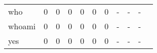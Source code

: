 \begin{longtable}{lp{1.2cm}p{1.2cm}p{1.2cm}p{1.2cm}p{1.2cm}p{1.2cm}p{1.2cm}p{1.2cm}p{1.2cm}p{1.2cm}}
who       &                                     0 &                                                  0 &                                                  0 &                                                  0 &                                                  0 &                                                  0 &                                             - &                                                  - &                                                  - \\
whoami    &                                     0 &                                                  0 &                                                  0 &                                                  0 &                                                  0 &                                                  0 &                                             - &                                                  - &                                                  - \\
yes       &                                     0 &                                                  0 &                                                  0 &                                                  0 &                                                  0 &                                                  0 &                                             - &                                                  - &                                                  - \\
\end{longtable}
